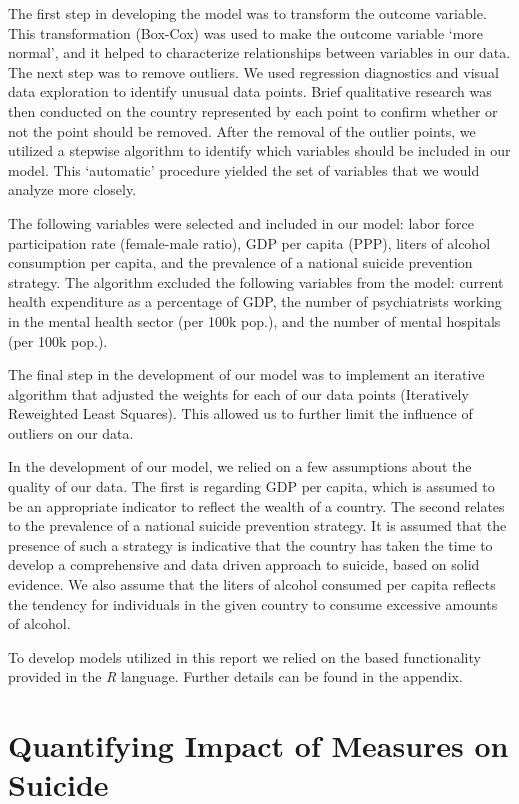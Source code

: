 \documentclass[]{article}
\begin{document}
The first step in developing the model was to transform the outcome
variable. This transformation (Box-Cox) was used to make the outcome
variable `more normal', and it helped to characterize relationships
between variables in our data. The next step was to remove outliers. We
used regression diagnostics and visual data exploration to identify
unusual data points. Brief qualitative research was then conducted on
the country represented by each point to confirm whether or not the
point should be removed. After the removal of the outlier points, we
utilized a stepwise algorithm to identify which variables should be
included in our model. This `automatic' procedure yielded the set of
variables that we would analyze more closely.

The following variables were selected and included in our model: labor
force participation rate (female-male ratio), GDP per capita (PPP),
liters of alcohol consumption per capita, and the prevalence of a
national suicide prevention strategy. The algorithm excluded the
following variables from the model: current health expenditure as a
percentage of GDP, the number of psychiatrists working in the mental
health sector (per 100k pop.), and the number of mental hospitals (per
100k pop.).

The final step in the development of our model was to implement an
iterative algorithm that adjusted the weights for each of our data
points (Iteratively Reweighted Least Squares). This allowed us to
further limit the influence of outliers on our data.

In the development of our model, we relied on a few assumptions about
the quality of our data. The first is regarding GDP per capita, which is
assumed to be an appropriate indicator to reflect the wealth of a
country. The second relates to the prevalence of a national suicide
prevention strategy. It is assumed that the presence of such a strategy
is indicative that the country has taken the time to develop a
comprehensive and data driven approach to suicide, based on solid
evidence. We also assume that the liters of alcohol consumed per capita
reflects the tendency for individuals in the given country to consume
excessive amounts of alcohol.

To develop models utilized in this report we relied on the based
functionality provided in the \emph{R} language. Further details can be
found in the appendix.

\section{Quantifying Impact of Measures on
Suicide}\label{quantifying-impact-of-measures-on-suicide}
\end{document}
